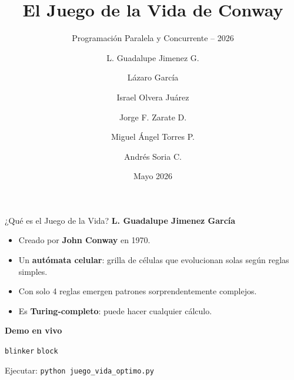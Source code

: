 \documentclass[10pt,aspectratio=169]{beamer}
\title[El Juego de la Vida]{El Juego de la Vida de Conway}
\subtitle{Programación Paralela y Concurrente -- 2026}
\author[Equipo Rosa]{
  L. Guadalupe Jimenez G. \and
  Lázaro García \and
  Israel Olvera Juárez \and
  Jorge F. Zarate D. \and
  Miguel Ángel Torres P. \and
  Andrés Soria C.
}
\institute[UNAM]{Universidad Nacional Autónoma de México}
\date{Mayo 2026}
\newcommand{\demo}[1]{\textcolor{democolor}{\texttt{#1}}}
\begin{document}
\begin{frame}
  \titlepage
\end{frame}

\begin{frame}{¿Qué es el Juego de la Vida?}
  \textbf{L. Guadalupe Jimenez García}

  \vspace{0.4cm}

  \begin{itemize}
    \item Creado por \textbf{John Conway} en 1970.
    \item Un \textbf{autómata celular}: grilla de células que evolucionan
          solas según reglas simples.
    \item Con solo 4 reglas emergen patrones sorprendentemente complejos.
    \item Es \textbf{Turing-completo}: puede hacer cualquier cálculo.
  \end{itemize}

  \vspace{0.5cm}

  \begin{center}
    \textbf{Demo en vivo}

    \demo{blinker} \quad \demo{block}

    \small Ejecutar: \texttt{python juego\_vida\_optimo.py}
  \end{center}
\end{frame}
\end{document}
